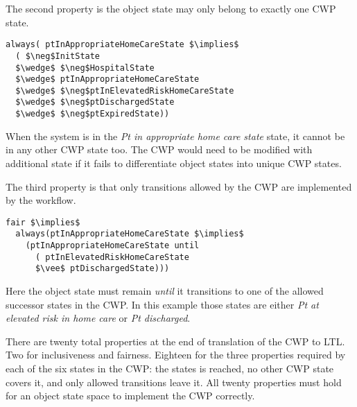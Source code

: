 The second property is the object state may only belong to exactly one CWP state.
%
{\small
\begin{lstlisting}[style=myPromela,mathescape=true]
always( ptInAppropriateHomeCareState $\implies$ 
  ( $\neg$InitState
  $\wedge$ $\neg$HospitalState 
  $\wedge$ ptInAppropriateHomeCareState 
  $\wedge$ $\neg$ptInElevatedRiskHomeCareState 
  $\wedge$ $\neg$ptDischargedState 
  $\wedge$ $\neg$ptExpiredState))
\end{lstlisting}
}
%
\noindent When the system is in the \emph{Pt in appropriate home care state} state, it cannot be in any other CWP state too.
The CWP would need to be modified with additional state if it fails to differentiate object states into unique CWP states.

The third property is that only transitions allowed by the CWP are implemented by the workflow.
%
{\small
\begin{lstlisting}[style=myPromela,mathescape=true]
fair $\implies$ 
  always(ptInAppropriateHomeCareState $\implies$ 
    (ptInAppropriateHomeCareState until
      ( ptInElevatedRiskHomeCareState
      $\vee$ ptDischargedState)))
\end{lstlisting}
}
%
\noindent Here the object state must remain \emph{until} it transitions to one of the allowed successor states in the CWP.
In this example those states are either \emph{Pt at elevated risk in home care} or \emph{Pt discharged}.

There are twenty total properties at the end of translation of the CWP to LTL.
Two for inclusiveness and fairness.
Eighteen for the three properties required by each of the six states in the CWP: the states is reached, no other CWP state covers it, and only allowed transitions leave it.
All twenty properties must hold for an object state space to implement the CWP correctly.
